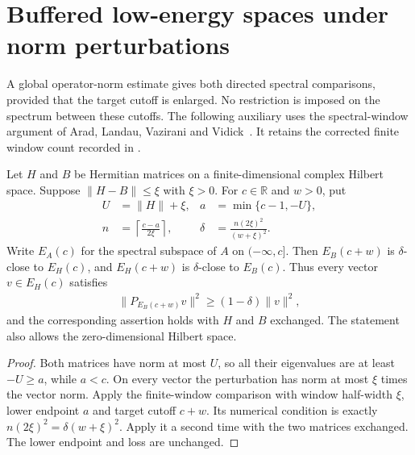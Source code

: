 \section{Buffered low-energy spaces under norm perturbations}
\label{sec:buffered_spectral_norm}

A global operator-norm estimate gives both directed spectral comparisons,
provided that the target cutoff is enlarged. No restriction is imposed on
the spectrum between these cutoffs. The following auxiliary uses the
spectral-window argument of Arad, Landau, Vazirani and
Vidick~\cite[lines 955--968 and 1412--1420]{Arad2016RigorousRG}.
It retains the corrected finite window count recorded in
\cite{gap:alvv16_hard_truncation_windows}.

\begin{lemma}
    \label{lem:buffered_spectral_norm_pair}
    \leanok
    Let $H$ and $B$ be Hermitian matrices on a finite-dimensional complex
    Hilbert space. Suppose $\|H-B\|\leq\xi$ with $\xi>0$.
    For $c\in\mathbb R$ and $w>0$, put
    \begin{align}
        U      & =\|H\|+\xi,                               & a & =\min\{c-1,-U\}, \\
        n      & =\left\lceil\frac{c-a}{2\xi}\right\rceil, &
        \delta & =\frac{n(2\xi)^2}{(w+\xi)^2}.
    \end{align}
    Write $E_A(c)$ for the spectral subspace of $A$ on $(-\infty,c]$.
    Then $E_B(c+w)$ is $\delta$-close to $E_H(c)$, and
    $E_H(c+w)$ is $\delta$-close to $E_B(c)$.
    Thus every vector $v\in E_H(c)$ satisfies
    \begin{align}
        \|P_{E_B(c+w)}v\|^2\geq(1-\delta)\|v\|^2,
    \end{align}
    and the corresponding assertion holds with $H$ and $B$ exchanged.
    The statement also allows the zero-dimensional Hilbert space.
\end{lemma}
\begin{proof}\leanok
    Both matrices have norm at most $U$, so all their eigenvalues are at
    least $-U\geq a$, while $a<c$. On every vector the perturbation has
    norm at most $\xi$ times the vector norm. Apply the finite-window
    comparison with window half-width $\xi$, lower endpoint $a$ and
    target cutoff $c+w$. Its numerical condition is exactly
    $n(2\xi)^2=\delta(w+\xi)^2$. Apply it a second time with the two
    matrices exchanged. The lower endpoint and loss are unchanged.
\end{proof}


